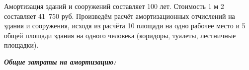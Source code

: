 
Амортизация зданий и сооружений составляет 100 лет. Стоимость 1 м 2 составляет 41~750 руб. Произведём расчёт амортизационных отчислений на здания и сооружения, исходя из расчёта 10 \sqMeter площади на одно рабочее место и 5 \sqMeter общей площади здания на одного человека (коридоры, туалеты, лестничные площадки).


\textbf{\textit{Общие затраты на амортизацию:}}

